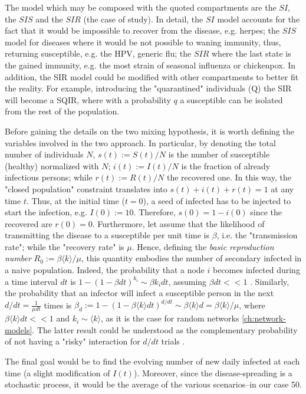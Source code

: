 \documentclass[a4paper,10pt,twoside]{book} %
\theoremstyle{definition}
\begin{document}
The model which may be composed with the quoted compartments are the $SI$, the $SIS$ and the $SIR$ (the case of study). In detail, the $SI$ model accounts for the fact that it would be impossible to recover from the disease, e.g. herpes; the $SIS$ model for diseases where it would be not possible to waning immunity, thus, returning susceptible, e.g. the HPV, generic flu; the $SIR$ where the last state is the gained immunity, e.g. the most strain of seasonal influenza or chickenpox.
In addition, the SIR model could be modified with other compartments to better fit the reality. For example, introducing the "quarantined" individuals (Q) the SIR will become a SQIR, where with a probability $ q$ a susceptible can be isolated from the rest of the population.

Before gaining the details on the two mixing hypothesis, it is worth defining the variables involved in the two approach.
In particular, by denoting the total number of individuals $N$, $s(t) := S(t)/N$ is the number of susceptible (healthy) normalized with $N$; $i(t):=I(t)/N$ is the fraction of already infectious persons; while $r(t) := R(t)/N$ the recovered one. In this way, the "closed population" constraint translates into $s(t)+i(t)+r(t)=1$ at any time $t$. 
Thus, at the initial time ($t = 0$), a seed of infected has to be injected to start the infection, e.g. $I(0) := 10$. Therefore, $s(0) = 1 - i(0)$ since the recovered are $r(0) = 0$.
Furthermore, let assume that the likelihood of transmitting the disease to a susceptible per unit time is $\beta$, i.e. the "transmission rate"; while the "recovery rate" is $\mu$. Hence, defining the \textit{basic reproduction number}  $R_0 := \beta \langle k \rangle / \mu$, this quantity embodies the number of secondary infected in a naive population. Indeed, the probability that a node $i$  becomes infected during a time interval $dt$ is $1-(1-\beta dt)^{k_i} \sim \beta k_i dt$, assuming $ \beta dt << 1$ \cite{barabasi::2016networkbook}. Similarly, the probability that an infector will infect a susceptible person in the next $d/dt = \frac{1}{ \mu dt}$ times is $\beta_d:= 1-(1-\beta \langle k \rangle dt)^{d/dt} \sim \beta \langle k \rangle d = \beta \langle k \rangle/\mu$, where $ \beta \langle k \rangle dt << 1$ and $k_i \sim \langle k \rangle$, as it is the case for random networks \autoref{ch:network-models}. The latter result could be understood as the complementary probability of not having a "risky" interaction for $d/dt$ trials \cite{Thurner::Appendix_NetBasedExpl}. 

The final goal would be to find the evolving number of new daily infected at each time (a slight modification of $I(t)$). Moreover, since the disease-spreading is a stochastic process, it would be the average of the various scenarios--in our case 50.
\end{document}

